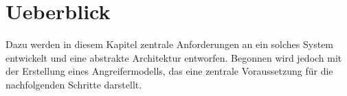 \chapter{Ueberblick}



Dazu werden in diesem Kapitel zentrale Anforderungen an ein solches System entwickelt und eine abstrakte Architektur entworfen. Begonnen wird jedoch mit der Erstellung eines Angreifermodells, das eine zentrale Voraussetzung für die nachfolgenden Schritte darstellt.





